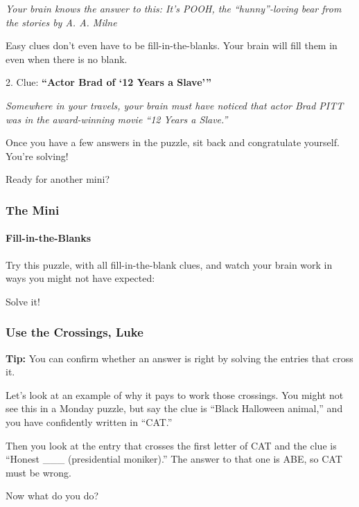 \emph{Your brain knows the answer to this: It's POOH, the
``hunny''-loving bear from the stories by A. A. Milne}

Easy clues don't even have to be fill-in-the-blanks. Your brain will
fill them in even when there is no blank.

2. Clue: \textbf{``Actor Brad of `12 Years a Slave'''}

\emph{Somewhere in your travels, your brain must have noticed that actor
Brad PITT was in the award-winning movie ``12 Years a Slave.''}

Once you have a few answers in the puzzle, sit back and congratulate
yourself. You're solving!

Ready for another mini?~

\hypertarget{the-mini-1}{%
\subsubsection{The Mini}\label{the-mini-1}}

\href{https://www.nytimes.com/crosswords/game/special/fill-in-the-blank}{}

\hypertarget{fill-in-the-blanks}{%
\paragraph{Fill-in-the-Blanks}\label{fill-in-the-blanks}}

Try this puzzle, with all fill-in-the-blank clues, and watch your brain
work in ways you might not have expected:

Solve it!

\hypertarget{use-the-crossings-luke}{%
\subsubsection{Use the Crossings, Luke}\label{use-the-crossings-luke}}

\textbf{Tip:} You can confirm whether an answer is right by solving the
entries that cross it.

Let's look at an example of why it pays to work those crossings. You
might not see this in a Monday puzzle, but say the clue is ``Black
Halloween animal,'' and you have confidently written in ``CAT.''~

Then you look at the entry that crosses the first letter of CAT and the
clue is ``Honest \_\_\_ (presidential moniker).'' The answer to that one
is ABE, so CAT must be wrong.~

Now what do you do?

